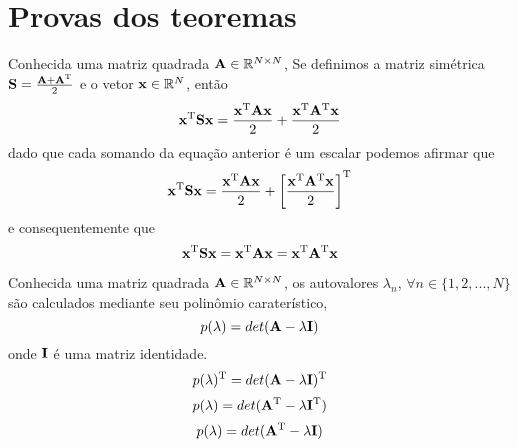 \section{Provas dos teoremas}

\begin{myproofT}\label{proof:theo:simetricmatrix0}
Conhecida uma matriz quadrada $\MATRIX{A} \in \mathbb{R}^{N \times N}$,
Se definimos a matriz simétrica $\MATRIX{S}=\frac{\MATRIX{A}+\MATRIX{A}^{\transpose}}{2}$ e
o vetor $\VECTOR{x} \in \mathbb{R}^{N}$, então
\begin{equation}
\VECTOR{x}^{\transpose}\MATRIX{S}\VECTOR{x} = 
\frac{\VECTOR{x}^{\transpose}\MATRIX{A}\VECTOR{x}}{2} +
\frac{\VECTOR{x}^{\transpose}\MATRIX{A}^{\transpose}\VECTOR{x}}{2}
\end{equation}
dado que cada somando da equação anterior é um escalar podemos afirmar que 
\begin{equation}
\VECTOR{x}^{\transpose}\MATRIX{S}\VECTOR{x} = 
\frac{\VECTOR{x}^{\transpose}\MATRIX{A}\VECTOR{x}}{2} +
\left[\frac{\VECTOR{x}^{\transpose}\MATRIX{A}^{\transpose}\VECTOR{x}}{2}\right]^{\transpose}
\end{equation}
e consequentemente que
\begin{equation}
\VECTOR{x}^{\transpose}\MATRIX{S}\VECTOR{x} = 
\VECTOR{x}^{\transpose}\MATRIX{A}\VECTOR{x} =
\VECTOR{x}^{\transpose}\MATRIX{A}^{\transpose}\VECTOR{x}
\end{equation} 
\end{myproofT}

\begin{myproofT}\label{proof:theo:matrixgeneric3}
Conhecida uma matriz quadrada $\MATRIX{A} \in \mathbb{R}^{N \times N}$, 
os  autovalores $\lambda_n$, $\forall n \in \{1, 2, ..., N\}$ são calculados mediante 
seu polinômio caraterístico,
\begin{equation}
p(\lambda)=det(\MATRIX{A}-\lambda \MATRIX{I})
\end{equation}
onde $\MATRIX{I}$ é uma matriz identidade.
\begin{equation}
p(\lambda)^{\transpose}=det(\MATRIX{A}-\lambda \MATRIX{I})^{\transpose}
\end{equation}
\begin{equation}
p(\lambda)=det(\MATRIX{A}^{\transpose}-\lambda \MATRIX{I}^{\transpose})
\end{equation}
\begin{equation}
p(\lambda)=det(\MATRIX{A}^{\transpose}-\lambda \MATRIX{I})
\end{equation}
\end{myproofT}

